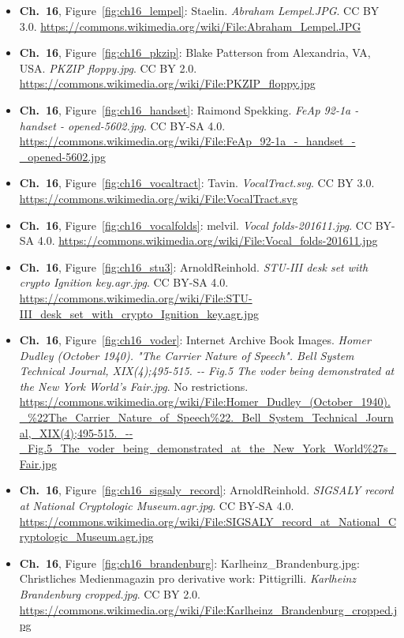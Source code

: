 \begin{small}
\begin{itemize}[leftmargin=0pt,itemsep=2pt,label={}]
\item \textbf{Ch.~16}, Figure~\ref{fig:ch16_lempel}: Staelin. \emph{Abraham Lempel.\allowbreak{}JPG}. CC BY 3.0. \url{https://commons.wikimedia.org/wiki/File:Abraham_Lempel.JPG}
\item \textbf{Ch.~16}, Figure~\ref{fig:ch16_pkzip}: Blake Patterson from Alexandria, VA, USA. \emph{PKZIP floppy.\allowbreak{}jpg}. CC BY 2.0. \url{https://commons.wikimedia.org/wiki/File:PKZIP_floppy.jpg}
\item \textbf{Ch.~16}, Figure~\ref{fig:ch16_handset}: Raimond Spekking. \emph{FeAp 92-\allowbreak{}1a -\allowbreak{} handset -\allowbreak{} opened-\allowbreak{}5602.\allowbreak{}jpg}. CC BY-SA 4.0. \url{https://commons.wikimedia.org/wiki/File:FeAp_92-1a_-_handset_-_opened-5602.jpg}
\item \textbf{Ch.~16}, Figure~\ref{fig:ch16_vocaltract}: Tavin. \emph{VocalTract.\allowbreak{}svg}. CC BY 3.0. \url{https://commons.wikimedia.org/wiki/File:VocalTract.svg}
\item \textbf{Ch.~16}, Figure~\ref{fig:ch16_vocalfolds}: melvil. \emph{Vocal folds-\allowbreak{}201611.\allowbreak{}jpg}. CC BY-SA 4.0. \url{https://commons.wikimedia.org/wiki/File:Vocal_folds-201611.jpg}
\item \textbf{Ch.~16}, Figure~\ref{fig:ch16_stu3}: ArnoldReinhold. \emph{STU-\allowbreak{}III desk set with crypto Ignition key.\allowbreak{}agr.\allowbreak{}jpg}. CC BY-SA 4.0. \url{https://commons.wikimedia.org/wiki/File:STU-III_desk_set_with_crypto_Ignition_key.agr.jpg}
\item \textbf{Ch.~16}, Figure~\ref{fig:ch16_voder}: Internet Archive Book Images. \emph{Homer Dudley (October 1940).\allowbreak{} "The Carrier Nature of Speech".\allowbreak{} Bell System Technical Journal, XIX(4);495-\allowbreak{}515.\allowbreak{} -\allowbreak{}-\allowbreak{} Fig.\allowbreak{}5 The voder being demonstrated at the New York World's Fair.\allowbreak{}jpg}. No restrictions. \url{https://commons.wikimedia.org/wiki/File:Homer_Dudley_(October_1940)._%22The_Carrier_Nature_of_Speech%22._Bell_System_Technical_Journal,_XIX(4);495-515._--_Fig.5_The_voder_being_demonstrated_at_the_New_York_World%27s_Fair.jpg}
\item \textbf{Ch.~16}, Figure~\ref{fig:ch16_sigsaly_record}: ArnoldReinhold. \emph{SIGSALY record at National Cryptologic Museum.\allowbreak{}agr.\allowbreak{}jpg}. CC BY-SA 4.0. \url{https://commons.wikimedia.org/wiki/File:SIGSALY_record_at_National_Cryptologic_Museum.agr.jpg}
\item \textbf{Ch.~16}, Figure~\ref{fig:ch16_brandenburg}: Karlheinz\_Brandenburg.jpg: Christliches Medienmagazin pro derivative work: Pittigrilli. \emph{Karlheinz Brandenburg cropped.\allowbreak{}jpg}. CC BY 2.0. \url{https://commons.wikimedia.org/wiki/File:Karlheinz_Brandenburg_cropped.jpg}

\end{itemize}
\end{small}
